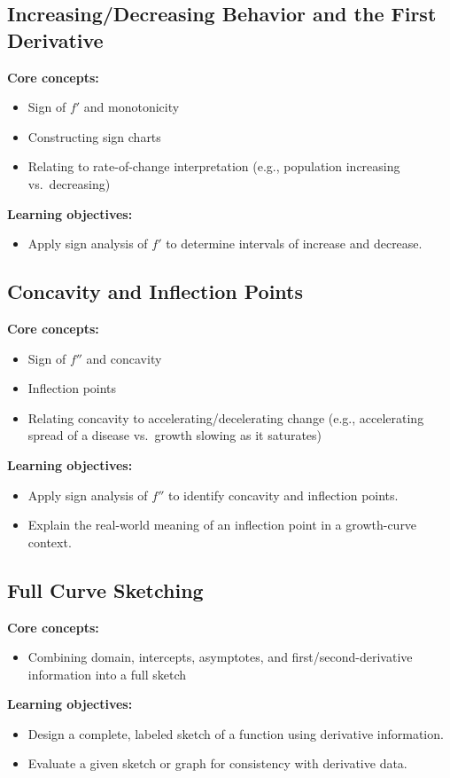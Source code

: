 \documentclass{article}
\begin{document}
\subsection{Increasing/Decreasing Behavior and the First Derivative}
\textbf{Core concepts:}
\begin{itemize}[leftmargin=*]
  \item Sign of $f'$ and monotonicity
  \item Constructing sign charts
  \item Relating to rate-of-change interpretation (e.g., population increasing vs.\ decreasing)
\end{itemize}
\textbf{Learning objectives:}
\begin{itemize}[leftmargin=*]
  \item Apply sign analysis of $f'$ to determine intervals of increase and decrease.
\end{itemize}

\subsection{Concavity and Inflection Points}
\textbf{Core concepts:}
\begin{itemize}[leftmargin=*]
  \item Sign of $f''$ and concavity
  \item Inflection points
  \item Relating concavity to accelerating/decelerating change (e.g., accelerating spread of a disease vs.\ growth slowing as it saturates)
\end{itemize}
\textbf{Learning objectives:}
\begin{itemize}[leftmargin=*]
  \item Apply sign analysis of $f''$ to identify concavity and inflection points.
  \item Explain the real-world meaning of an inflection point in a growth-curve context.
\end{itemize}

\subsection{Full Curve Sketching}
\textbf{Core concepts:}
\begin{itemize}[leftmargin=*]
  \item Combining domain, intercepts, asymptotes, and first/second-derivative information into a full sketch
\end{itemize}
\textbf{Learning objectives:}
\begin{itemize}[leftmargin=*]
  \item Design a complete, labeled sketch of a function using derivative information.
  \item Evaluate a given sketch or graph for consistency with derivative data.
\end{itemize}
\end{document}
